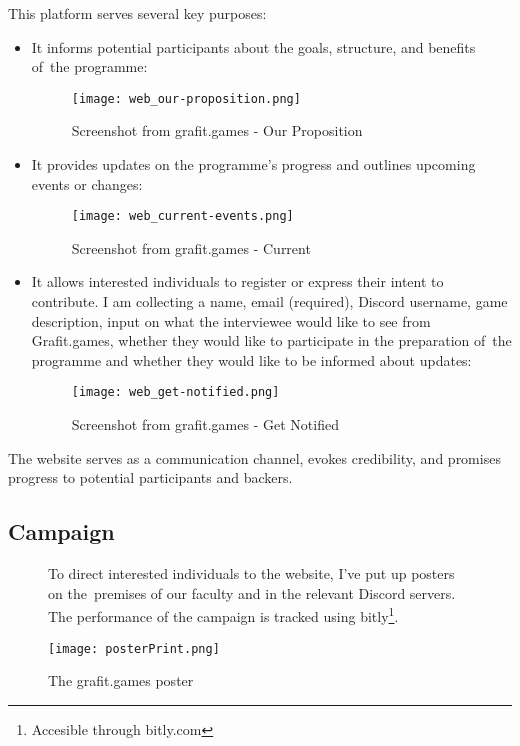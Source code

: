 This platform serves several key purposes:
\begin{itemize}
    \item It informs potential participants about the goals, structure, and benefits of~the programme:
    \begin{figure}[H]
        \texttt{[image: web\_our-proposition.png]}
        \caption{Screenshot from grafit.games - Our Proposition}
        \label{fig:web_our-proposition}
    \end{figure}
    \item It provides updates on the programme’s progress and outlines upcoming events or changes:
    \begin{figure}[H]
        \texttt{[image: web\_current-events.png]}
        \caption{Screenshot from grafit.games - Current}
        \label{fig:web_current-events}
    \end{figure}
    \item It allows interested individuals to register or express their intent to contribute. I am collecting a name, email (required), Discord username, game description, input on what the interviewee would like to see from Grafit.games, whether they would like to participate in the preparation of~the programme and whether they would like to be informed about updates:
    \begin{figure}[H]    
        \texttt{[image: web\_get-notified.png]}
        \caption{Screenshot from grafit.games - Get Notified}
        \label{fig:web_get-notified}
    \end{figure}
\end{itemize}

The website serves as a communication channel, evokes credibility, and promises progress to potential participants and backers.
        
\subsection{Campaign}
\begin{figure}[H]
    To direct interested individuals to the website, I’ve put up posters on the~premises of our faculty and in the relevant Discord servers. The performance of the campaign is tracked using bitly\footnote{Accesible through bitly.com}.
    
    \vspace{1em}
    \texttt{[image: posterPrint.png]}
    \caption{The grafit.games poster}
    \label{fig:poster}
\end{figure}

